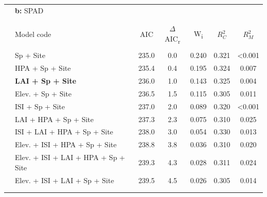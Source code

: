 \documentclass[a4paper,10pt,]{report}
\begin{document}
\begin{table}[H] \centering 
  \label{} 
\begin{tabular}{@{\extracolsep{5pt}} clSSSSS} 
& \textbf{\Large{b:}} SPAD &&&&&\\
\\[-1.8ex]\hline 
\hline \\[-1.8ex] 
 & Model code  & {AIC} & {$\Delta$AIC\textsubscript{r}} & {W\textsubscript{i}} & {$R_C^2$} & {$R_M^2$} \\ 
\hline \\[-1.8ex] 
 & Sp + Site &  235.0  &  0.0  &  0.240  &  0.321  &  <0.001  \\ 
 & HPA + Sp + Site &  235.4  &  0.4  &  0.195  &  0.324  &  0.007  \\ 
 & \textbf{LAI + Sp + Site} &  236.0  &  1.0  &  0.143  &  0.325  &  0.004  \\ 
 & Elev. + Sp + Site &  236.5  &  1.5  &  0.115  &  0.305  &  0.011  \\ 
 & ISI + Sp + Site &  237.0  &  2.0  &  0.089  &  0.320  &  <0.001  \\ 
 & LAI + HPA + Sp + Site &  237.3  &  2.3  &  0.075  &  0.310  &  0.025  \\ 
 & ISI + LAI + HPA + Sp + Site&  238.0  &  3.0  &  0.054  &  0.330  &  0.013  \\ 
 & Elev. + ISI + HPA + Sp + Site &  238.8  &  3.8  &  0.036  &  0.310  &  0.020  \\ 
 & Elev. + ISI + LAI + HPA + Sp + Site &  239.3  &  4.3  &  0.028  &  0.311  &  0.024  \\ 
 & Elev. + ISI + LAI + Sp + Site &  239.5  &  4.5  &  0.026  &  0.305  &  0.014  \\ 
\hline \\[-1.8ex] 
\hline\\
\end{tabular} 
\end{table} 
\end{document}
